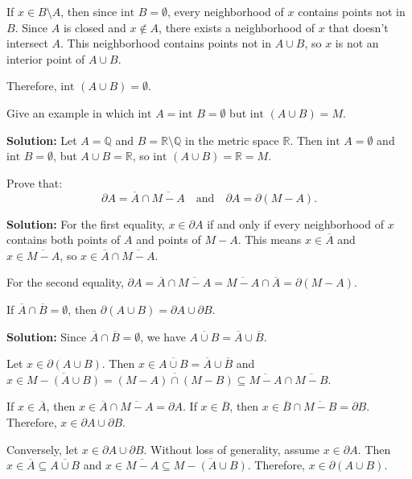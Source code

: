 If $x \in B \setminus A$, then since $\text{int } B = \emptyset$, every neighborhood of $x$ contains points not in $B$. Since $A$ is closed and $x \notin A$, there exists a neighborhood of $x$ that doesn't intersect $A$. This neighborhood contains points not in $A \cup B$, so $x$ is not an interior point of $A \cup B$.

Therefore, $\text{int } (A \cup B) = \emptyset$.

\begin{problembox}
Give an example in which \(\text{int } A = \text{int } B = \emptyset\) but \(\text{int } (A \cup B) = M\).
\end{problembox}

\textbf{Solution:} Let $A = \mathbb{Q}$ and $B = \mathbb{R} \setminus \mathbb{Q}$ in the metric space $\mathbb{R}$. Then $\text{int } A = \emptyset$ and $\text{int } B = \emptyset$, but $A \cup B = \mathbb{R}$, so $\text{int } (A \cup B) = \mathbb{R} = M$.

\begin{problembox}
Prove that:
\[
\partial A = \overline{A} \cap \overline{M - A} \quad \text{and} \quad \partial A = \partial(M - A).
\]
\end{problembox}

\textbf{Solution:} For the first equality, $x \in \partial A$ if and only if every neighborhood of $x$ contains both points of $A$ and points of $M - A$. This means $x \in \overline{A}$ and $x \in \overline{M - A}$, so $x \in \overline{A} \cap \overline{M - A}$.

For the second equality, $\partial A = \overline{A} \cap \overline{M - A} = \overline{M - A} \cap \overline{A} = \partial(M - A)$.

\begin{problembox}
If \(\overline{A} \cap \overline{B} = \emptyset\), then \(\partial(A \cup B) = \partial A \cup \partial B\).
\end{problembox}

\textbf{Solution:} Since $\overline{A} \cap \overline{B} = \emptyset$, we have $\overline{A \cup B} = \overline{A} \cup \overline{B}$.

Let $x \in \partial(A \cup B)$. Then $x \in \overline{A \cup B} = \overline{A} \cup \overline{B}$ and $x \in \overline{M - (A \cup B)} = \overline{(M - A) \cap (M - B)} \subseteq \overline{M - A} \cap \overline{M - B}$.

If $x \in \overline{A}$, then $x \in \overline{A} \cap \overline{M - A} = \partial A$. If $x \in \overline{B}$, then $x \in \overline{B} \cap \overline{M - B} = \partial B$. Therefore, $x \in \partial A \cup \partial B$.

Conversely, let $x \in \partial A \cup \partial B$. Without loss of generality, assume $x \in \partial A$. Then $x \in \overline{A} \subseteq \overline{A \cup B}$ and $x \in \overline{M - A} \subseteq \overline{M - (A \cup B)}$. Therefore, $x \in \partial(A \cup B)$.